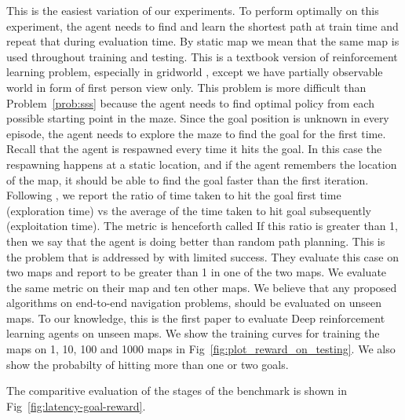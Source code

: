 \begin{description}
  \label{prob:sss}
   This is the easiest variation of our experiments. To perform
   optimally on this experiment, the agent needs to find and learn the
   shortest path at train time and repeat that during evaluation time. By static map we mean that the same map is used throughout training and testing.
  This is a textbook version of reinforcement learning problem, especially in gridworld \cite{SuBaBOOK1998}, except we have partially observable world in form of first person view only.
  This problem is more difficult than Problem~\ref{prob:sss} because the agent
  needs to find optimal policy from each possible starting point in the maze.
  Since the goal position is unknown in every episode, the agent needs to explore the maze to find the goal for the first time. Recall that the agent is respawned every time it hits the goal.
  In this case the respawning happens at a static location, and if the agent remembers the location of the map, it should be able to find the goal faster than
  the first iteration.
  Following \cite{MiPaViICLR2017}, we report the ratio
  of time taken to hit the goal first time (exploration time) vs the average of the time taken to hit goal subsequently (exploitation time). The metric is henceforth called \LatencyOneGtOne
  If this ratio is greater than 1, then we say that the agent is doing better than random path planning.
    This is the problem that is addressed by \cite{MiPaViICLR2017}
    with limited success. They evaluate this case on two maps and report \LatencyOneGtOne to be greater than 1 in one of the two maps. We evaluate the same metric on their map and ten other maps.
    We believe that any proposed algorithms on end-to-end navigation problems, should be evaluated on unseen maps.
    To our knowledge, this is the first paper to evaluate Deep reinforcement learning agents on unseen maps.
    We show the training curves for training the maps on 1, 10, 100 and 1000 maps in Fig~\ref{fig:plot_reward_on_testing}. We also show the probabilty of hitting more than one or two goals. 
\end{description}

The comparitive evaluation of the stages of the benchmark is shown in Fig~\ref{fig:latency-goal-reward}.

